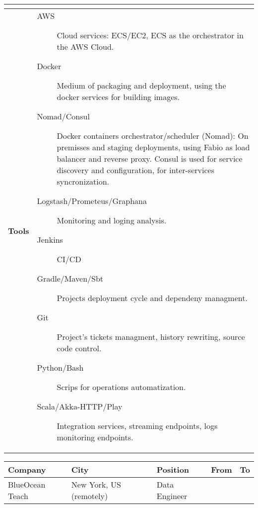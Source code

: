 \begin{cventries}
\begin{tabular}{|p{4.5cm} | p{2cm} | p{4cm} | p{2cm} | p{2cm}|}
{      } \\
      \hline
      \textbf{Tools} & \multicolumn{4}{p{12cm}|}{
                       \begin{description}
                       
                        \item[AWS] Cloud services: ECS/EC2, ECS as the orchestrator in the AWS Cloud.

                        \item[Docker] Medium of packaging and deployment, using the docker services for building images.

                        \item[Nomad/Consul] Docker containers orchestrator/scheduler (Nomad): On premisses and staging deployments, using Fabio as load balancer and reverse proxy. Consul is used for service discovery and configuration, for inter-services syncronization.

                        \item[Logstash/Prometeus/Graphana] Monitoring and loging analysis.

                        \item[Jenkins] CI/CD

                        \item[Gradle/Maven/Sbt] Projects deployment cycle and dependeny managment.
                       
                        \item[Git] Project's tickets managment, history rewriting, source code control.

                        \item[Python/Bash] Scrips for operations automatization.

                        \item[Scala/Akka-HTTP/Play] Integration services, streaming endpoints, logs monitoring endpoints.

                       \end{description}
      } \\
 

    \hline

  \end{tabular}



  \begin{tabular}{|p{4.5cm} | p{2cm} | p{4cm} | p{2cm} | p{2cm}|}
    \hline
    \textbf{Company} & 
    \textbf{City} & 
    \textbf{Position} & 
    \textbf{From} & \textbf{To} \\
     \hline
    BlueOcean Teach & 
    New York, US \hspace{1cm} (remotely) & 
    Data Engineer & 
    

\end{tabular}
\end{cventries}

